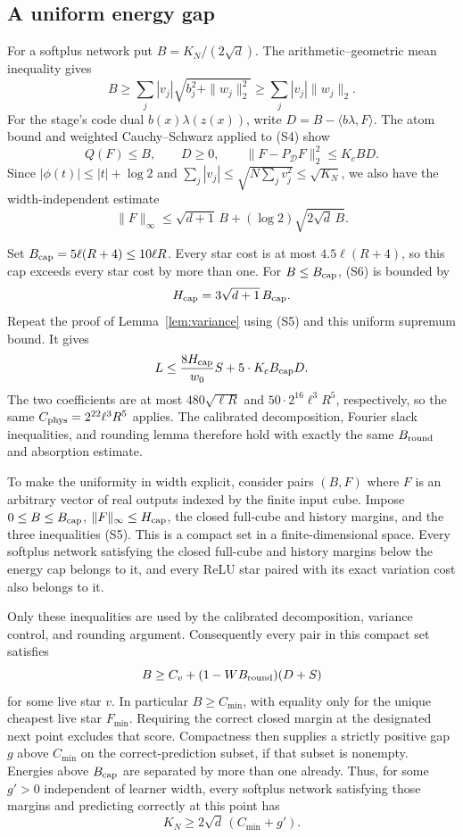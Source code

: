 \documentclass[11pt]{article}
\theoremstyle{remark}\newtheorem{remark}[theorem]{Remark}
\begin{document}
\subsection{A uniform energy gap}

For a softplus network put $B=K_N/(2\sqrt d)$. The arithmetic--geometric
mean inequality gives
\[
 B\ge\sum_j|v_j|\sqrt{b_j^2+\|w_j\|_2^2}
 \ge\sum_j|v_j|\|w_j\|_2.
\]
For the stage's code dual $b(x)\lambda(z(x))$, write
$D=B-\langle b\lambda,F\rangle$. The atom bound and weighted
Cauchy--Schwarz applied to (S4) show
\[
 Q(F)\le B,\qquad D\ge0,\qquad
 \|F-P_{\mathcal D}F\|_2^2\le K_cBD.
 \tag{S5}
\]
Since $|\phi(t)|\le|t|+\log2$ and
$\sum_j|v_j|\le\sqrt{N\sum_jv_j^2}\le\sqrt{K_N}$, we also have the
width-independent estimate
\[
 \|F\|_\infty
 \le\sqrt{d+1}\,B+(\log2)\sqrt{2\sqrt d\,B}.
 \tag{S6}
\]

Set $B_{\rm cap}=5\ell(R+4)\le10\ell R$. Every star cost is at most
$4.5\ell(R+4)$, so this cap exceeds every star cost by more than one.
For $B\le B_{\rm cap}$, (S6) is bounded by
\[
 H_{\rm cap}=3\sqrt{d+1}\,B_{\rm cap}.
\]
Repeat the proof of Lemma~\ref{lem:variance} using (S5) and this uniform
supremum bound. It gives
\[
 L\le\frac{8H_{\rm cap}}{w_0}S
       +5\cdot K_cB_{\rm cap}D.
\]
The two coefficients are at most $480\sqrt{\ell R}$ and
$50\cdot2^{16}\ell^3R^5$, respectively, so the same
$C_{\rm phys}=2^{22}\ell^3R^5$ applies. The calibrated decomposition,
Fourier slack inequalities, and rounding lemma therefore hold with
exactly the same $B_{\rm round}$ and absorption estimate.

To make the uniformity in width explicit, consider pairs $(B,F)$ where
$F$ is an arbitrary vector of real outputs indexed by the finite input
cube. Impose $0\le B\le B_{\rm cap}$,
$\|F\|_\infty\le H_{\rm cap}$, the closed full-cube and history margins,
and the three inequalities (S5). This is a compact set in a
finite-dimensional space. Every softplus network satisfying the closed
full-cube and history margins below the energy cap belongs to it, and
every ReLU star paired with its exact variation cost
also belongs to it.

Only these inequalities are used by the calibrated decomposition,
variance control, and rounding argument. Consequently every pair in
this compact set satisfies
\[
 B\ge C_v+(1-WB_{\rm round})(D+S)
\]
for some live star $v$. In particular $B\ge C_{\min}$, with equality
only for the unique cheapest live star $F_{\min}$.
Requiring the correct closed margin at the designated next point excludes
that score. Compactness then supplies a strictly positive gap $g$ above
$C_{\min}$ on the correct-prediction subset, if that subset is nonempty.
Energies above $B_{\rm cap}$ are separated by more than one already.
Thus, for some $g'>0$ independent of learner width, every softplus network
satisfying those margins and predicting correctly at this point has
\[
 K_N\ge2\sqrt d\,(C_{\min}+g').
 \tag{S7}
\]
\end{document}
